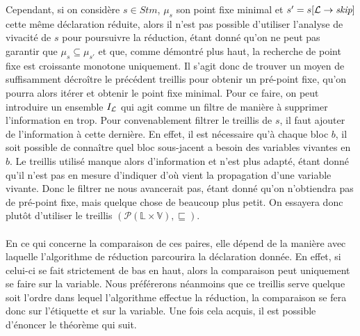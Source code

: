 \documentclass[a4paper, 10pt]{article}
\begin{document}
Cependant, si on considère $s \in Stm$, $\mu_s$ son point fixe minimal et $s' = s[\mathcal{L} \rightarrow{ \textit{skip} }]$ cette même déclaration
réduite, alors il n'est pas possible d'utiliser l'analyse de vivacité de $s$ pour poursuivre la réduction, étant donné qu'on ne peut pas garantir que
$\mu_{s} \subseteq \mu_{s'}$ et que, comme démontré plus haut, la recherche de point fixe est croissante monotone uniquement. 
Il s'agit donc de trouver un moyen de suffisamment décroître le précédent treillis pour obtenir un pré-point fixe, qu'on pourra alors itérer et obtenir
le point fixe minimal.
Pour ce faire, on peut introduire un ensemble $I_{\mathcal{L}}$ qui agit comme un filtre de manière à supprimer l'information en trop. 
Pour convenablement filtrer le treillis de $s$, il faut ajouter de l'information à cette dernière. 
En effet, il est nécessaire qu'à chaque bloc $b$, il soit possible de connaître quel bloc sous-jacent
a besoin des variables vivantes en $b$. Le treillis utilisé manque alors d'information et n'est plus adapté, étant donné qu'il n'est pas en mesure
d'indiquer d'où vient la propagation d'une variable vivante. Donc le filtrer ne nous avancerait pas, étant donné qu'on n'obtiendra pas de
pré-point fixe, mais quelque chose de beaucoup plus petit. On essayera donc plutôt d'utiliser le treillis $(\mathcal{P}(\mathbb{L} \times \mathbb{V}), \sqsubseteq)$. 
\\
\\
En ce qui concerne la comparaison de ces paires, elle dépend de la manière avec laquelle l'algorithme de réduction parcourira la déclaration donnée.
En effet, si celui-ci se fait strictement de bas en haut, alors la comparaison peut uniquement se faire sur la variable. Nous préférerons néanmoins
que ce treillis serve quelque soit l'ordre dans lequel l'algorithme effectue la réduction, la comparaison se fera donc sur l'étiquette
et sur la variable. Une fois cela acquis, il est possible d'énoncer le théorème qui suit.
\\
\\
\end{document}
